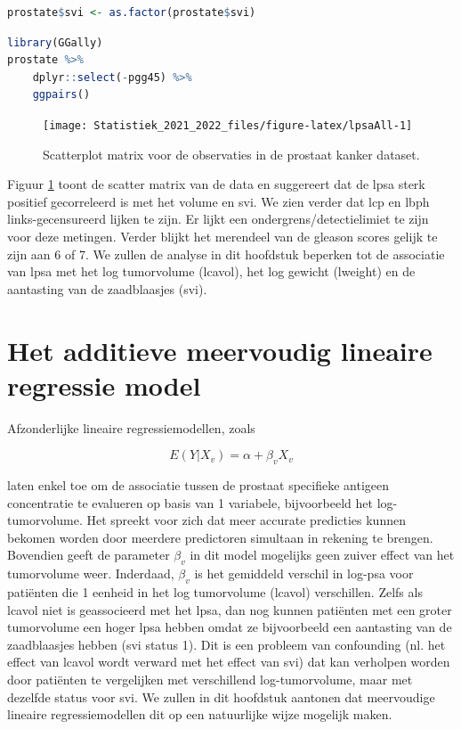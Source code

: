 \documentclass[
  12pt,dutch,coursenotes]{book}
\theoremstyle{definition}
\theoremstyle{definition}
\theoremstyle{definition}
\theoremstyle{definition}
\theoremstyle{remark}
\begin{document}
\begin{lstlisting}[language=R]
prostate$svi <- as.factor(prostate$svi)
\end{lstlisting}

\begin{lstlisting}[language=R]
library(GGally)
prostate %>%
    dplyr::select(-pgg45) %>%
    ggpairs()
\end{lstlisting}

\begin{figure}

{\centering \texttt{[image: Statistiek\_2021\_2022\_files/figure-latex/lpsaAll-1]} 

}

\caption{Scatterplot matrix voor de observaties in de prostaat kanker dataset.}\label{fig:lpsaAll}
\end{figure}

Figuur \ref{fig:lpsaAll} toont de scatter matrix van de data en suggereert dat de lpsa sterk positief gecorreleerd is met het volume en svi.
We zien verder dat lcp en lbph links-gecensureerd lijken te zijn. Er lijkt een ondergrens/detectielimiet te zijn voor deze metingen. Verder blijkt het merendeel van de gleason scores gelijk te zijn aan 6 of 7. We zullen de analyse in dit hoofdstuk beperken tot de associatie van lpsa met het log tumorvolume (lcavol), het log gewicht (lweight) en de aantasting van de zaadblaasjes (svi).

\hypertarget{het-additieve-meervoudig-lineaire-regressie-model}{%
\section{Het additieve meervoudig lineaire regressie model}\label{het-additieve-meervoudig-lineaire-regressie-model}}

Afzonderlijke lineaire regressiemodellen, zoals

\[E(Y|X_v)=\alpha+\beta_v X_v\]

laten enkel toe om de associatie tussen de prostaat specifieke antigeen concentratie te evalueren op basis van 1 variabele, bijvoorbeeld het log-tumorvolume. Het spreekt voor zich dat meer accurate predicties kunnen bekomen worden door meerdere predictoren simultaan in rekening te brengen.
Bovendien geeft de parameter \(\beta_v\) in dit model mogelijks geen zuiver effect van het tumorvolume weer. Inderdaad, \(\beta_v\) is het gemiddeld verschil in log-psa voor patiënten die 1 eenheid in het log tumorvolume (lcavol) verschillen. Zelfs als lcavol niet is geassocieerd met het lpsa, dan nog kunnen patiënten met een groter tumorvolume een hoger lpsa hebben omdat ze bijvoorbeeld een aantasting van de zaadblaasjes hebben (svi status 1). Dit is een probleem van confounding (nl. het effect van lcavol wordt verward met het effect van svi) dat kan verholpen worden door patiënten te vergelijken met verschillend log-tumorvolume, maar met dezelfde status voor svi. We zullen in dit hoofdstuk aantonen dat meervoudige lineaire regressiemodellen dit op een natuurlijke wijze mogelijk maken.
\end{document}
